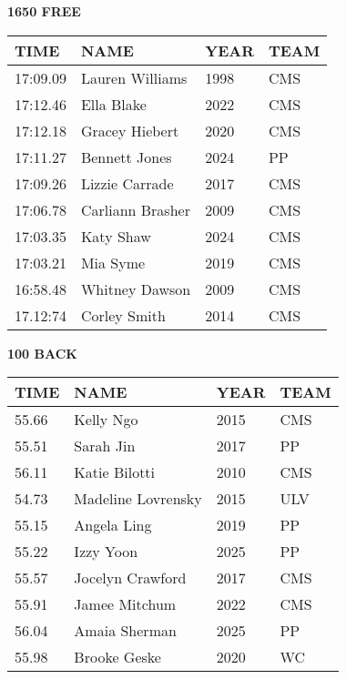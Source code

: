 \vspace{0.4cm}

\begin{minipage}[t]{0.48\textwidth}
\centering
\textbf{1650 FREE}\\[0.05cm]
\begin{tabular}{@{}p{1.8cm}p{2.8cm}p{1.2cm}p{1.4cm}@{}}
\hline
\textbf{TIME} & \textbf{NAME} & \textbf{YEAR} & \textbf{TEAM} \\
\hline
17:09.09 & Lauren Williams & 1998 & CMS \\
17:12.46 & Ella Blake & 2022 & CMS \\
17:12.18 & Gracey Hiebert & 2020 & CMS \\
17:11.27 & Bennett Jones & 2024 & PP \\
17:09.26 & Lizzie Carrade & 2017 & CMS \\
17:06.78 & Carliann Brasher & 2009 & CMS \\
17:03.35 & Katy Shaw & 2024 & CMS \\
17:03.21 & Mia Syme & 2019 & CMS \\
16:58.48 & Whitney Dawson & 2009 & CMS \\
17.12:74 & Corley Smith & 2014 & CMS \\
\hline
\end{tabular}
\end{minipage}\hfill
\begin{minipage}[t]{0.48\textwidth}
\centering
\textbf{100 BACK}\\[0.05cm]
\begin{tabular}{@{}p{1.8cm}p{2.8cm}p{1.2cm}p{1.4cm}@{}}
\hline
\textbf{TIME} & \textbf{NAME} & \textbf{YEAR} & \textbf{TEAM} \\
\hline
55.66 & Kelly Ngo & 2015 & CMS \\
55.51 & Sarah Jin & 2017 & PP \\
56.11 & Katie Bilotti & 2010 & CMS \\
54.73 & Madeline Lovrensky & 2015 & ULV \\
55.15 & Angela Ling & 2019 & PP \\
55.22 & Izzy Yoon & 2025 & PP \\
55.57 & Jocelyn Crawford & 2017 & CMS \\
55.91 & Jamee Mitchum & 2022 & CMS \\
56.04 & Amaia Sherman & 2025 & PP \\
55.98 & Brooke Geske & 2020 & WC \\
\hline
\end{tabular}
\end{minipage}

